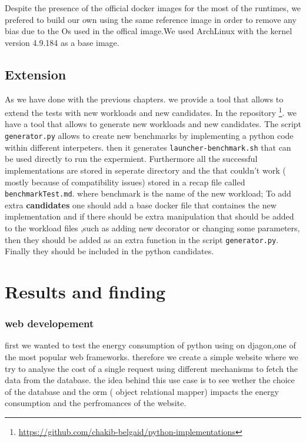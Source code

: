 Despite the presence of the official docker images for the most of the runtimes, we prefered to build our own using the same reference image in order to remove any bias due to the Os used in the offical image.We used ArchLinux with the kernel version 4.9.184 as a base image.


\subsection{Extension}
As we have done with the previous chapters. we provide a tool that allows to extend the tests with new workloads and new candidates. 
In the repository \footnote{\url{https://github.com/chakib-belgaid/python-implementations}}.
we have a tool that allows to generate new workloads and new candidates.
The script \texttt{generator.py} allows to create new benchmarks by implementing a python code within different interpeters. then it generates \texttt{launcher-benchmark.sh} that can be used directly to run the expermient. Furthermore all the successful implementations are stored in seperate directory and the that couldn't work ( mostly because of compatibility issues) stored in a recap file called \texttt{benchmarkTest.md}. where benchmark is the name of the new workload; 
To add extra \textbf{candidates} one should add a base docker file 
that containes the new implementation and if there should be extra manipulation that should be added to the workload files ,such as adding new decorator or changing some parameters, then they should be added as an extra function in the script \texttt{generator.py}. Finally they should be included in the python candidates.

\section{Results and finding}











\subsubsection{web developement}
first we wanted to test the energy consumption of python using on djagon,one of the most popular web frameworks.
therefore we create a simple website where we try to analyse the cost of a single request using different mechanisms to fetch the data from the database.
the idea behind this use case is to see wether the choice of the database and the orm ( object relational mapper) impacts the energy consumption and the perfromances of the website.

